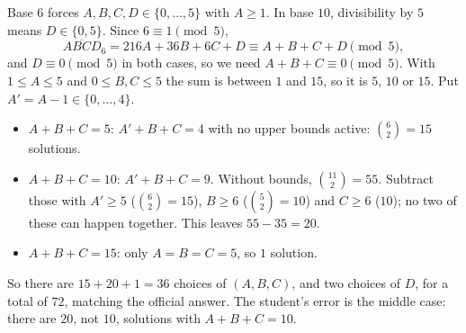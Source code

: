 Base $6$ forces $A,B,C,D\in\{0,\dots,5\}$ with $A\ge1$. In base $10$, divisibility by $5$ means $D\in\{0,5\}$. Since $6\equiv1\pmod5$,
\[
\overline{ABCD}_6=216A+36B+6C+D\equiv A+B+C+D\pmod5,
\]
and $D\equiv0\pmod 5$ in both cases, so we need $A+B+C\equiv0\pmod5$. With $1\le A\le5$ and $0\le B,C\le5$ the sum is between $1$ and $15$, so it is $5$, $10$ or $15$. Put $A'=A-1\in\{0,\dots,4\}$.
\begin{itemize}
\item $A+B+C=5$: $A'+B+C=4$ with no upper bounds active: $\binom62=15$ solutions.
\item $A+B+C=10$: $A'+B+C=9$. Without bounds, $\binom{11}2=55$. Subtract those with $A'\ge5$ ($\binom62=15$), $B\ge6$ ($\binom52=10$) and $C\ge6$ ($10$); no two of these can happen together. This leaves $55-35=20$.
\item $A+B+C=15$: only $A=B=C=5$, so $1$ solution.
\end{itemize}
So there are $15+20+1=36$ choices of $(A,B,C)$, and two choices of $D$, for a total of $\boxed{72}$, matching the official answer. The student's error is the middle case: there are $20$, not $10$, solutions with $A+B+C=10$.
